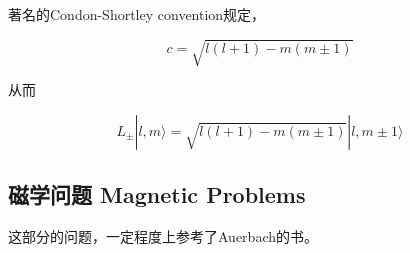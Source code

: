 著名的Condon-Shortley convention规定，

\begin{equation}
c = \sqrt{l(l+1) - m(m\pm1)}
\end{equation}

从而

\begin{equation}
L_{\pm}|l,m\rangle = \sqrt{l(l+1) - m(m\pm 1)}|l,m\pm1\rangle
\end{equation}

\newpage
\subsection{磁学问题 Magnetic Problems}

这部分的问题，一定程度上参考了Auerbach的书\cite{Auerbach}。